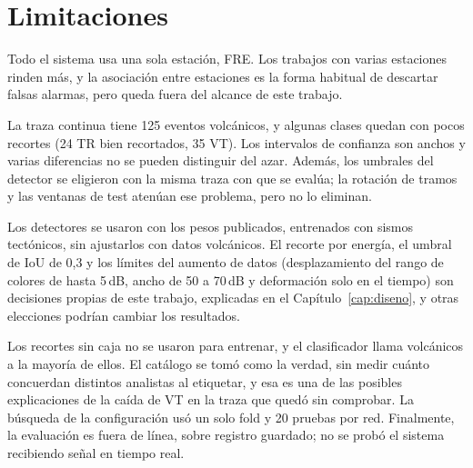\section{Limitaciones}
\label{sec:disc-limitaciones}

Todo el sistema usa una sola estación, FRE. Los trabajos con varias
estaciones rinden más, y la asociación entre estaciones es la forma habitual de
descartar falsas alarmas, pero queda fuera del alcance de este trabajo.

La traza continua tiene 125 eventos volcánicos, y algunas clases quedan con
pocos recortes (24 TR bien recortados, 35 VT). Los intervalos de confianza
son anchos y varias diferencias no se pueden distinguir del azar. Además, los
umbrales del detector se eligieron con la misma traza con que se evalúa; la
rotación de tramos y las ventanas de test atenúan ese problema, pero no lo
eliminan.

Los detectores se usaron con los pesos publicados, entrenados con sismos
tectónicos, sin ajustarlos con datos volcánicos. El recorte por energía, el
umbral de IoU de 0,3 y los límites del aumento de datos (desplazamiento del
rango de colores de hasta 5\,dB, ancho de 50 a 70\,dB y deformación solo en el
tiempo) son decisiones propias de este trabajo, explicadas en el
Capítulo~\ref{cap:diseno}, y otras elecciones podrían cambiar los resultados.

Los recortes sin caja no se usaron para entrenar, y el clasificador llama
volcánicos a la mayoría de ellos. El catálogo se tomó como la verdad, sin
medir cuánto concuerdan distintos analistas al etiquetar, y esa es una de las
posibles explicaciones de la caída de VT en la traza que quedó sin comprobar.
La búsqueda de la configuración usó un solo fold y 20 pruebas por red.
Finalmente, la evaluación es fuera de línea, sobre registro guardado; no se
probó el sistema recibiendo señal en tiempo real.
